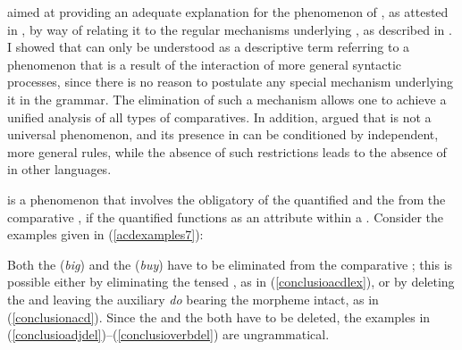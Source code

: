  aimed at providing an adequate explanation for the phenomenon of , as attested in , by way of relating it to the regular mechanisms underlying , as described in . I showed that  can only be understood as a descriptive term referring to a phenomenon that is a result of the interaction of more general syntactic processes, since there is no reason to postulate any special mechanism underlying it in the grammar. The elimination of such a mechanism allows one to achieve a unified analysis of all types of comparatives. In addition,  argued that  is not a universal phenomenon, and its presence in  can be conditioned by independent, more general rules, while the absence of such restrictions leads to the absence of  in other languages.

 is a phenomenon that involves the obligatory  of the quantified  and the  from the comparative , if the quantified  functions as an attribute within a . Consider the examples given in (\ref{acdexamples7}):

\ea \label{acdexamples7}
 \label{conclusionacd}
 \label{conclusioacdlex}
 \label{conclusioadjdel}
 \label{conclusioverbdel}
\z
\z

Both the  (\textit{big}) and the  (\textit{buy}) have to be eliminated from the comparative ; this is possible either by eliminating the tensed , as in (\ref{conclusioacdlex}), or by deleting the  and leaving the auxiliary \textit{do} bearing the  morpheme intact, as in (\ref{conclusionacd}). Since the  and the  both have to be deleted, the examples in (\ref{conclusioadjdel})–(\ref{conclusioverbdel}) are ungrammatical.

